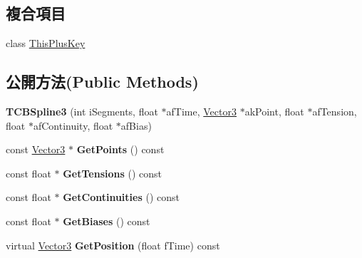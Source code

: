 \subsection*{複合項目}
\begin{DoxyCompactItemize}
\item 
class \hyperlink{class_magnum_1_1_t_c_b_spline3_1_1_this_plus_key}{This\+Plus\+Key}
\end{DoxyCompactItemize}
\subsection*{公開方法(Public Methods)}
\begin{DoxyCompactItemize}
\item 
{\bfseries T\+C\+B\+Spline3} (int i\+Segments, float $\ast$af\+Time, \hyperlink{class_magnum_1_1_vector3}{Vector3} $\ast$ak\+Point, float $\ast$af\+Tension, float $\ast$af\+Continuity, float $\ast$af\+Bias)\hypertarget{class_magnum_1_1_t_c_b_spline3_a0c13ca480f2447735fc319a4ff0806db}{}\label{class_magnum_1_1_t_c_b_spline3_a0c13ca480f2447735fc319a4ff0806db}

\item 
const \hyperlink{class_magnum_1_1_vector3}{Vector3} $\ast$ {\bfseries Get\+Points} () const \hypertarget{class_magnum_1_1_t_c_b_spline3_aa3fa2646d6fa66ff359f9c5053ea2524}{}\label{class_magnum_1_1_t_c_b_spline3_aa3fa2646d6fa66ff359f9c5053ea2524}

\item 
const float $\ast$ {\bfseries Get\+Tensions} () const \hypertarget{class_magnum_1_1_t_c_b_spline3_aa9d1ea566db461a2e98d878146b539a3}{}\label{class_magnum_1_1_t_c_b_spline3_aa9d1ea566db461a2e98d878146b539a3}

\item 
const float $\ast$ {\bfseries Get\+Continuities} () const \hypertarget{class_magnum_1_1_t_c_b_spline3_ac40bbb0e8e5ae2753ab0cb1174f472af}{}\label{class_magnum_1_1_t_c_b_spline3_ac40bbb0e8e5ae2753ab0cb1174f472af}

\item 
const float $\ast$ {\bfseries Get\+Biases} () const \hypertarget{class_magnum_1_1_t_c_b_spline3_a01177317fac92b45c5a9a6bb8e4627cc}{}\label{class_magnum_1_1_t_c_b_spline3_a01177317fac92b45c5a9a6bb8e4627cc}

\item 
virtual \hyperlink{class_magnum_1_1_vector3}{Vector3} {\bfseries Get\+Position} (float f\+Time) const \hypertarget{class_magnum_1_1_t_c_b_spline3_a7b055edcb9b81a448ebd58fd777953a1}{}\label{class_magnum_1_1_t_c_b_spline3_a7b055edcb9b81a448ebd58fd777953a1}


\end{DoxyCompactItemize}
